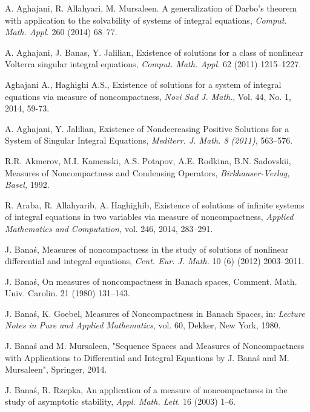 \documentclass{amsart}
\theoremstyle{plain}
\numberwithin{equation}{section}
\begin{document}
\bigskip

\begin{thebibliography}{99}
 A. Aghajani, R. Allahyari, M. Mursaleen. A
generalization of Darbo's theorem with application to the solvability of
systems of integral equations, \textit{Comput. Math. Appl.} 260 (2014)
68--77.

 A. Aghajani, J. Banas, Y. Jalilian, Existence of
solutions for a class of nonlinear Volterra singular integral equations, 
\textit{Comput. Math. Appl.} 62 (2011) 1215--1227.

 Aghajani A., Haghighi A.S., Existence of solutions
for a system of integral equations via measure of noncompactness, \textit{Novi Sad J. Math}., Vol. 44, No. 1, 2014, 59-73.

 A. Aghajani, Y. Jalilian, Existence of Nondecreasing
Positive Solutions for a System of Singular Integral Equations, \textit{Mediterr. J. Math. 8 (2011)}, 563--576.

 R.R. Akmerov, M.I. Kamenski, A.S. Potapov, A.E. Rodkina,
B.N. Sadovskii, Measures of Noncompactness and Condensing Operators, \textit{Birkhauser-Verlag, Basel,} 1992.

 R. Araba, R. Allahyarib, A. Haghighib, Existence of solutions
of infinite systems of integral equations in two variables via measure of
noncompactness, \textit{Applied Mathematics and Computation, }vol. 246,
2014, 283--291.

 J. Bana\'{s}, Measures of noncompactness in the study of
solutions of nonlinear differential and integral equations, \textit{Cent.
Eur. J. Math.} 10 (6) (2012) 2003--2011.

 J. Bana\'{s}, On measures of noncompactness in Banach
spaces, Comment. Math. Univ. Carolin. 21 (1980) 131--143.

 J. Bana\'{s}, K. Goebel, Measures of Noncompactness in
Banach Spaces, in: \textit{Lecture Notes in Pure and Applied Mathematics},
vol. 60, Dekker, New York, 1980.

 J. Bana\'{s} and M. Mursaleen, "Sequence Spaces and
Measures of Noncompactness with Applications to Differential and Integral
Equations by J. Bana\'{s} and M. Mursaleen", Springer, 2014.

 J. Bana\'{s}, R. Rzepka, An application of a measure of
noncompactness in the study of asymptotic stability, \textit{Appl. Math. Lett}. 16 (2003) 1--6.


\end{thebibliography}
\end{document}
